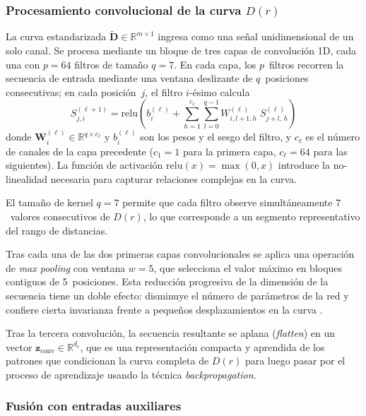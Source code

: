 \documentclass[a4paper,fleqn]{cas-sc}
\numberwithin{equation}{section}
\begin{document}
\subsubsection{Procesamiento convolucional de la curva $D(r)$}

La curva estandarizada
$\tilde{\mathbf{D}}\in\mathbb{R}^{m\times 1}$ ingresa como una se\~nal
unidimensional de un solo canal. Se procesa mediante un bloque de tres capas
de convoluci\'on 1D, cada una con $p=64$ filtros de tama\~no $q=7$. En cada
capa, los $p$~filtros recorren la secuencia de entrada mediante una ventana
deslizante de $q$~posiciones consecutivas; en cada posici\'on~$j$, el filtro
$i$-\'esimo calcula
\begin{equation}
    S^{(\ell+1)}_{j,i} = \mathrm{relu}\!\left(
    b^{(\ell)}_i + \sum_{h=1}^{c_\ell}\sum_{l=0}^{q-1}
    W^{(\ell)}_{i,l+1,h}\; S^{(\ell)}_{j+l,\,h}
    \right)
    \label{eq:conv1d}
\end{equation}
donde $\mathbf{W}^{(\ell)}_i\in\mathbb{R}^{q\times c_\ell}$ y
$b^{(\ell)}_i$ son los pesos y el sesgo del filtro, y $c_\ell$ es el
n\'umero de canales de la capa precedente ($c_1=1$ para la primera capa,
$c_\ell=64$ para las siguientes). La funci\'on de activaci\'on
$\mathrm{relu}(x)=\max(0,x)$ introduce la no-linealidad necesaria para
capturar relaciones complejas en la curva.

El tama\~no de kernel $q=7$ permite que cada filtro observe simult\'aneamente
$7$~valores consecutivos de $D(r)$, lo que corresponde a un segmento
representativo del rango de distancias.

Tras cada una de las dos primeras capas convolucionales se aplica una
operaci\'on de \emph{max pooling} con ventana $w=5$, que selecciona el valor
m\'aximo en bloques contiguos de 5~posiciones. Esta reducci\'on progresiva de
la dimensi\'on de la secuencia tiene un doble efecto: disminuye el n\'umero
de par\'ametros de la red y confiere cierta invarianza frente a peque\~nos
desplazamientos en la curva \citep{biscione2021cnns}.

Tras la tercera convoluci\'on, la secuencia resultante se aplana
(\emph{flatten}) en un vector
$\mathbf{z}_{\mathrm{conv}}\in\mathbb{R}^{d_c}$, que es una
representaci\'on compacta y aprendida de los patrones que condicionan la
curva completa de $D(r)$ para luego pasar por el proceso de aprendizaje
usando la t\'ecnica \emph{backpropagation}.

\subsubsection{Fusi\'on con entradas auxiliares}
\end{document}
